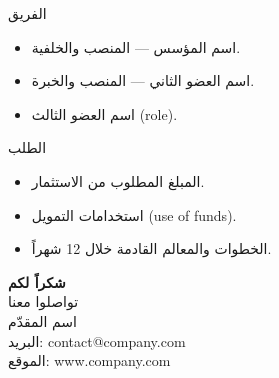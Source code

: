\documentclass[aspectratio=169,11pt]{beamer}
\let\textEN\textenglish
\begin{document}
\begin{frame}{الفريق}
\begin{itemize}
  \item اسم المؤسس — المنصب والخلفية.
  \item اسم العضو الثاني — المنصب والخبرة.
  \item اسم العضو الثالث \textEN{(role)}.
\end{itemize}
\end{frame}

\begin{frame}{الطلب}
\begin{itemize}
  \item المبلغ المطلوب من الاستثمار.
  \item استخدامات التمويل \textEN{(use of funds)}.
  \item الخطوات والمعالم القادمة خلال 12 شهراً.
\end{itemize}
\end{frame}

\begin{frame}[plain]
\begin{center}
\vspace{1.2cm}
{\Huge\bfseries\color{accent} شكراً لكم}\\[1cm]
{\Large تواصلوا معنا}\\[0.8cm]
{\large اسم المقدّم}\\
{\normalsize البريد: \textEN{contact@company.com}}\\
{\normalsize الموقع: \textEN{www.company.com}}
\end{center}
\end{frame}
\end{document}
